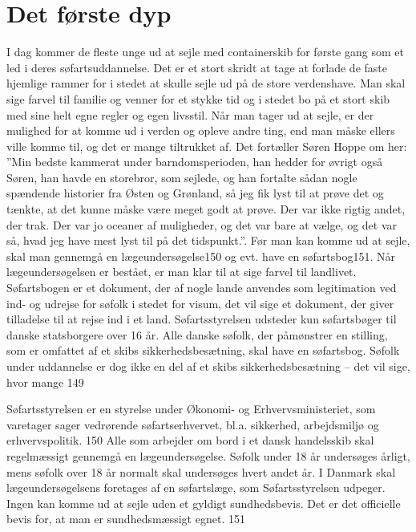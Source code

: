 \chapter{Det første dyp}\label{det-fuxf8rste-dyp}

I dag kommer de fleste unge ud at sejle med containerskib for første
gang som et led i deres søfartsuddannelse. Det er et stort skridt at
tage at forlade de faste hjemlige rammer for i stedet at skulle sejle ud
på de store verdenshave. Man skal sige farvel til familie og venner for
et stykke tid og i stedet bo på et stort skib med sine helt egne regler
og egen livsstil. Når man tager ud at sejle, er der mulighed for at
komme ud i verden og opleve andre ting, end man måske ellers ville komme
til, og det er mange tiltrukket af. Det fortæller Søren Hoppe om her:
''Min bedste kammerat under barndomsperioden, han hedder for øvrigt også
Søren, han havde en storebror, som sejlede, og han fortalte sådan nogle
spændende historier fra Østen og Grønland, så jeg fik lyst til at prøve
det og tænkte, at det kunne måske være meget godt at prøve. Der var ikke
rigtig andet, der trak. Der var jo oceaner af muligheder, og det var
bare at vælge, og det var så, hvad jeg have mest lyst til på det
tidspunkt.''. Før man kan komme ud at sejle, skal man gennemgå en
lægeundersøgelse150 og evt. have en søfartsbog151. Når lægeundersøgelsen
er bestået, er man klar til at sige farvel til landlivet. Søfartsbogen
er et dokument, der af nogle lande anvendes som legitimation ved ind- og
udrejse for søfolk i stedet for visum, det vil sige et dokument, der
giver tilladelse til at rejse ind i et land. Søfartsstyrelsen udsteder
kun søfartsbøger til danske statsborgere over 16 år. Alle danske søfolk,
der påmønstrer en stilling, som er omfattet af et skibs
sikkerhedsbesætning, skal have en søfartsbog. Søfolk under uddannelse er
dog ikke en del af et skibs sikkerhedsbesætning -- det vil sige, hvor
mange 149

Søfartsstyrelsen er en styrelse under Økonomi- og Erhvervsministeriet,
som varetager sager vedrørende søfartserhvervet, bl.a. sikkerhed,
arbejdsmiljø og erhvervspolitik. 150 Alle som arbejder om bord i et
dansk handelsskib skal regelmæssigt gennemgå en lægeundersøgelse. Søfolk
under 18 år undersøges årligt, mens søfolk over 18 år normalt skal
undersøges hvert andet år. I Danmark skal lægeundersøgelsens foretages
af en søfartslæge, som Søfartsstyrelsen udpeger. Ingen kan komme ud at
sejle uden et gyldigt sundhedsbevis. Det er det officielle bevis for, at
man er sundhedsmæssigt egnet. 151

